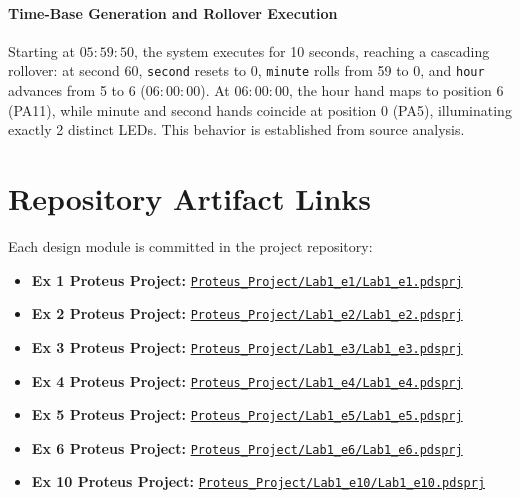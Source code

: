 \documentclass[oneside,final]{hcmut-report}
\begin{document}
\paragraph{Time-Base Generation and Rollover Execution}
Starting at $05:59:50$, the system executes for 10 seconds, reaching a cascading rollover: at second 60, \texttt{second} resets to 0, \texttt{minute} rolls from 59 to 0, and \texttt{hour} advances from 5 to 6 ($06:00:00$). At $06:00:00$, the hour hand maps to position 6 (PA11), while minute and second hands coincide at position 0 (PA5), illuminating exactly 2 distinct LEDs. This behavior is established from source analysis.


\section{Repository Artifact Links}
Each design module is committed in the project repository:
\begin{itemize}[leftmargin=*,itemsep=1pt]
  \item \textbf{Ex 1 Proteus Project:} \href{https://github.com/tapstoptap/microcontroller-261/raw/77b62e494c47b4563374bc61c562bf9e5548d887/Proteus_Project/Lab1_e1/Lab1_e1.pdsprj}{\texttt{Proteus\_Project/Lab1\_e1/Lab1\_e1.pdsprj}}
  \item \textbf{Ex 2 Proteus Project:} \href{https://github.com/tapstoptap/microcontroller-261/raw/77b62e494c47b4563374bc61c562bf9e5548d887/Proteus_Project/Lab1_e2/Lab1_e2.pdsprj}{\texttt{Proteus\_Project/Lab1\_e2/Lab1\_e2.pdsprj}}
  \item \textbf{Ex 3 Proteus Project:} \href{https://github.com/tapstoptap/microcontroller-261/raw/77b62e494c47b4563374bc61c562bf9e5548d887/Proteus_Project/Lab1_e3/Lab1_e3.pdsprj}{\texttt{Proteus\_Project/Lab1\_e3/Lab1\_e3.pdsprj}}
  \item \textbf{Ex 4 Proteus Project:} \href{https://github.com/tapstoptap/microcontroller-261/raw/77b62e494c47b4563374bc61c562bf9e5548d887/Proteus_Project/Lab1_e4/Lab1_e4.pdsprj}{\texttt{Proteus\_Project/Lab1\_e4/Lab1\_e4.pdsprj}}
  \item \textbf{Ex 5 Proteus Project:} \href{https://github.com/tapstoptap/microcontroller-261/raw/77b62e494c47b4563374bc61c562bf9e5548d887/Proteus_Project/Lab1_e5/Lab1_e5.pdsprj}{\texttt{Proteus\_Project/Lab1\_e5/Lab1\_e5.pdsprj}}
  \item \textbf{Ex 6 Proteus Project:} \href{https://github.com/tapstoptap/microcontroller-261/raw/77b62e494c47b4563374bc61c562bf9e5548d887/Proteus_Project/Lab1_e6/Lab1_e6.pdsprj}{\texttt{Proteus\_Project/Lab1\_e6/Lab1\_e6.pdsprj}}
  \item \textbf{Ex 10 Proteus Project:} \href{https://github.com/tapstoptap/microcontroller-261/raw/77b62e494c47b4563374bc61c562bf9e5548d887/Proteus_Project/Lab1_e10/Lab1_e10.pdsprj}{\texttt{Proteus\_Project/Lab1\_e10/Lab1\_e10.pdsprj}}
\end{itemize}
\end{document}
